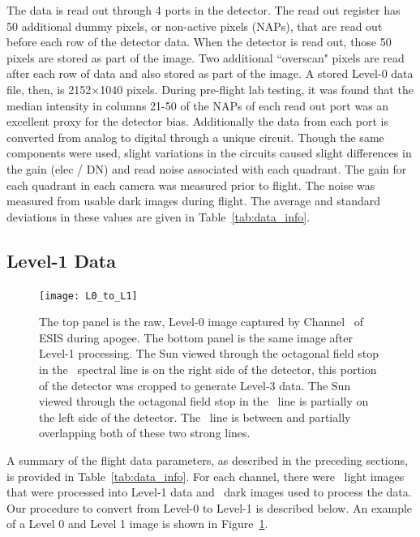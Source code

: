	    The data is read out through 4 ports in the detector.  The read out register has 50 additional dummy pixels, or non-active pixels (NAPs), that are read out before each row of the detector data.  When the detector is read out, those 50 pixels are stored as part of the image.  Two additional ``overscan" pixels are read after each row of data and also stored as part of the image.  A stored Level-0 data file, then, is 2152$\times$1040 pixels.   During pre-flight lab testing, it was found that the median intensity in columns 21-50 of the NAPs of each read out port was an excellent proxy for the detector bias.  Additionally the data from each port is converted from analog to digital through a unique circuit.  Though the same components were used, slight variations in the circuits caused slight differences in the gain (elec / DN) and read  noise associated with each quadrant.  The gain for each quadrant in each camera was measured prior to flight.  The noise was measured from usable dark images during flight.  The average and standard deviations in these values are given in Table~\ref{tab:data_info}.
    
    \subsection{Level-1 Data}
	    \begin{figure}
	    	\centering
	    	\texttt{[image: L0\_to\_L1]}
	    	\caption{The top panel is the raw, Level-0 image captured by Channel \ of ESIS during apogee. The bottom panel is the same image after Level-1 processing. The Sun viewed through the octagonal field stop in the \ov \ spectral line is on the right side of the detector, this portion of the detector was cropped to generate Level-3 data.  The Sun viewed through the octagonal field stop in the \hei \ line is partially on the left side of the detector. The \mgxbright \ line is between and partially overlapping both of these two strong lines.}
	    	\label{fig:L0_to_L1}
	    \end{figure}
    	
    	A summary of the flight data parameters, as described in the preceding sections, is provided in Table~\ref{tab:data_info}. 
    	For each channel, there were \numDataFrames\ light images that were processed into Level-1 data and \numDarkFrames\ dark images used to process the data.
    	Our procedure to convert from Level-0 to Level-1 is described below. An example of a Level 0 and Level 1 image is shown in Figure~\ref{fig:L0_to_L1}.
    	
